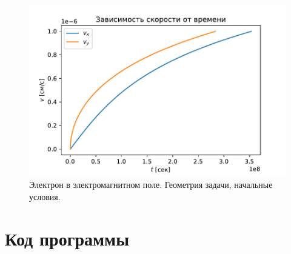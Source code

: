 \documentclass[a4paper]{article}
\begin{document}
\begin{figure}

	\includegraphics[width=\linewidth]{plotSpeed.pdf}
	\caption{Электрон в электромагнитном поле. Геометрия задачи, начальные условия.}
	\label{graph_s}
\end{figure}

\newpage
\section{Код программы}\label{code}

\end{document}
